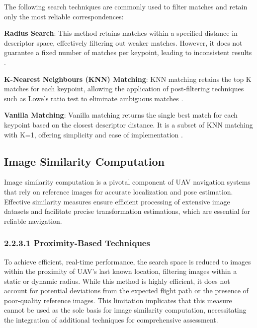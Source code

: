The following search techniques are commonly used to filter matches and retain only the most reliable correspondences:

\textbf{Radius Search}: This method retains matches within a specified distance in descriptor space, effectively filtering out weaker matches. However, it does not guarantee a fixed number of matches per keypoint, leading to inconsistent results \cite{opencv_matcher_tutorial}.

\textbf{K-Nearest Neighbours (KNN) Matching}: KNN matching retains the top K matches for each keypoint, allowing the application of post-filtering techniques such as Lowe’s ratio test to eliminate ambiguous matches \cite{opencv_matcher_tutorial}.

\textbf{Vanilla Matching}: Vanilla matching returns the single best match for each keypoint based on the closest descriptor distance. It is a subset of KNN matching with K=1, offering simplicity and ease of implementation \cite{opencv_matcher_tutorial}.





\subsection{Image Similarity Computation}

Image similarity computation is a pivotal component of UAV navigation systems that rely on reference images for accurate localization and pose estimation. Effective similarity measures ensure efficient processing of extensive image datasets and facilitate precise transformation estimations, which are essential for reliable navigation.

\subsubsection{2.2.3.1 Proximity-Based Techniques}

To achieve efficient, real-time performance, the search space is reduced to images within the proximity of UAV's last known location, filtering images within a static or dynamic radius. While this method is highly efficient, it does not account for potential deviations from the expected flight path or the presence of poor-quality reference images. This limitation implicates that this measure cannot be used as the sole basis for image similarity computation, necessitating the integration of additional techniques for comprehensive assessment.

